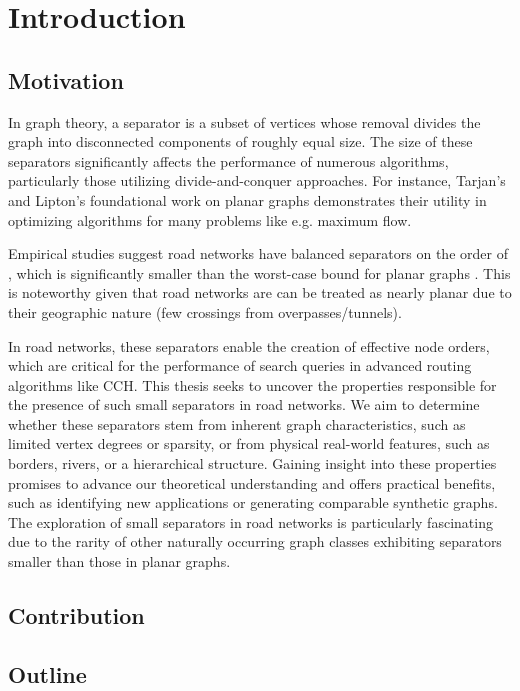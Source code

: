 \chapter{Introduction}
\label{ch:introduction}


\section{Motivation}
\label{sec:motivation}

In graph theory, a separator is a subset of vertices whose removal divides the graph into disconnected components of roughly equal size.
The size of these separators significantly affects the performance of numerous algorithms, particularly those utilizing divide-and-conquer approaches.
For instance, Tarjan's and Lipton's foundational work on planar graphs \cite{lipton_applications_1977} demonstrates their utility in optimizing algorithms for many problems like e.g. maximum flow.

Empirical studies suggest road networks have balanced separators on the order of  \cite{dibbelt_customizable_2016}, which is significantly smaller than the  worst-case bound for planar graphs \cite{lipton_separator_1979}.
This is noteworthy given that road networks are can be treated as nearly planar due to their geographic nature (few crossings from overpasses/tunnels).

In road networks, these separators enable the creation of effective node orders, which are critical for the performance of search queries in advanced routing algorithms like CCH.
This thesis seeks to uncover the properties responsible for the presence of such small separators in road networks.
We aim to determine whether these separators stem from inherent graph characteristics, such as limited vertex degrees or sparsity, or from physical real-world features, such as borders, rivers, or a hierarchical structure.
Gaining insight into these properties promises to advance our theoretical understanding and offers practical benefits, such as identifying new applications or generating comparable synthetic graphs.
The exploration of small separators in road networks is particularly fascinating due to the rarity of other naturally occurring graph classes exhibiting separators smaller than those in planar graphs.

\section{Contribution}
\label{sec:Contribution}


\section{Outline}
\label{sec:overview}

